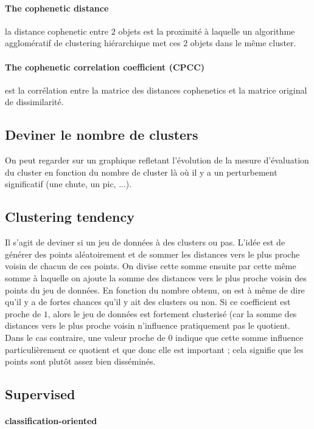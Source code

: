 \documentclass{article}
\begin{document}
\begin{sffamily}
\paragraph{The cophenetic distance} la distance cophenetic entre $2$ objets est la proximité à laquelle un algorithme agglomératif de
clustering hiérarchique met ces $2$ objets dans le même cluster.

\paragraph{The cophenetic correlation coefficient (CPCC)} est la corrélation entre la matrice des distances cophenetics et la matrice 
original de dissimilarité.

\subsection{Deviner le nombre de clusters} On peut regarder sur un graphique refletant l'évolution de la mesure d'évaluation du cluster en 
fonction du nombre de cluster là où il y a un perturbement significatif (une chute, un pic, ...).

\subsection{Clustering tendency} Il s'agit de deviner si un jeu de données à des clusters ou pas. L'idée est de générer des points 
aléatoirement et de sommer les distances vers le plus proche voisin de chacun de ces points. On divise cette somme ensuite par cette même 
somme à laquelle on ajoute la somme des distances vers le plus proche voisin des points du jeu de données. En fonction du nombre obtenu, on 
est à même de dire qu'il y a de fortes chances qu'il y ait des clusters ou non. Si ce coefficient est proche de $1$, alors le jeu de 
données est fortement clusterisé (car la somme des distances vers le plus proche voisin n'influence pratiquement pas le quotient. Dans le
cas contraire, une valeur proche de $0$ indique que cette somme influence particulièrement ce quotient et que donc elle est important ; 
cela signifie que les points sont plutôt assez bien disséminés.

\subsection{Supervised}

\paragraph{classification-oriented}


\end{sffamily}
\end{document}
